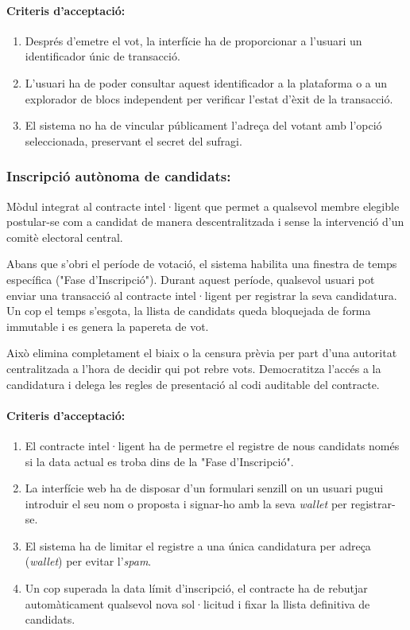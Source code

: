 \paragraph{Criteris d'acceptació:}
\begin{enumerate}[label=\roman*.]
    \item Després d'emetre el vot, la interfície ha de proporcionar a l'usuari un identificador únic de transacció.
    \item L'usuari ha de poder consultar aquest identificador a la plataforma o a un explorador de blocs independent per verificar l'estat d'èxit de la transacció.
    \item El sistema no ha de vincular públicament l'adreça del votant amb l'opció seleccionada, preservant el secret del sufragi.
\end{enumerate}

\subsubsection{Inscripció autònoma de candidats:}
Mòdul integrat al contracte intel·ligent que permet a qualsevol membre elegible postular-se com a candidat de manera descentralitzada i sense la intervenció d'un comitè electoral central.

Abans que s'obri el període de votació, el sistema habilita una finestra de temps específica ("Fase d'Inscripció"). 
Durant aquest període, qualsevol usuari pot enviar una transacció al contracte intel·ligent per registrar la seva candidatura. 
Un cop el temps s'esgota, la llista de candidats queda bloquejada de forma immutable i es genera la papereta de vot.

Això elimina completament el biaix o la censura prèvia per part d'una autoritat centralitzada a l'hora de decidir qui pot rebre vots. Democratitza l'accés a la candidatura i delega les regles de presentació al codi auditable del contracte.

\paragraph{Criteris d'acceptació:}
\begin{enumerate}[label=\roman*.]
    \item El contracte intel·ligent ha de permetre el registre de nous candidats només si la data actual es troba dins de la "Fase d'Inscripció".
    \item La interfície web ha de disposar d'un formulari senzill on un usuari pugui introduir el seu nom o proposta i signar-ho amb la seva \textit{wallet} per registrar-se.
    \item El sistema ha de limitar el registre a una única candidatura per adreça (\textit{wallet}) per evitar l'\textit{spam}.
    \item Un cop superada la data límit d'inscripció, el contracte ha de rebutjar automàticament qualsevol nova sol·licitud i fixar la llista definitiva de candidats.
\end{enumerate}

